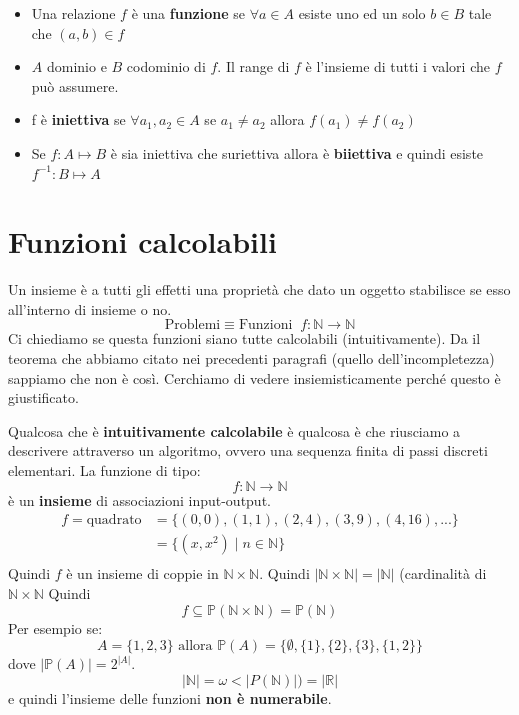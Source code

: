 \documentclass[a4paper]{article}
\begin{document}
\begin{itemize}
    \item Una relazione $f$ è una \textbf{funzione} se $\forall a \in A$ esiste uno ed un solo $b \in B$ tale che $(a,b) \in f$
    \item $A$ dominio e $B$ codominio di $f$. Il range di $f$ è l'insieme di tutti i valori che $f$ può assumere.
    \item f è \textbf{iniettiva} se $\forall a_1,a_2 \in A$ se $a_1 \neq a_2$ allora $f(a_1) \neq f(a_2)$
    \item Se $f : A \mapsto B$ è sia iniettiva che suriettiva allora è \textbf{biiettiva} e quindi esiste $f^{-1} : B \mapsto A$ 
\end{itemize}



\section{Funzioni calcolabili}

Un insieme è a tutti gli effetti una proprietà che dato un oggetto
stabilisce se esso all'interno di insieme o no.
\[\text{Problemi} \equiv \text{Funzioni} \; \; f : \mathbb{N} \rightarrow \mathbb{N}\]
Ci chiediamo se questa funzioni siano tutte calcolabili (intuitivamente). Da il teorema che abbiamo citato
nei precedenti paragrafi (quello dell'incompletezza) sappiamo che non è così.
Cerchiamo di vedere insiemisticamente perché questo è giustificato.

{
Qualcosa che è \textbf{intuitivamente calcolabile} è qualcosa è che riusciamo a descrivere
attraverso un algoritmo, ovvero una sequenza finita di passi discreti elementari.
}
La funzione di tipo:
\[f : \mathbb{N} \rightarrow \mathbb{N}\]
è un \textbf{insieme} di associazioni input-output. 
\ex{}
{
    \[
    \begin{aligned}
        f = \text{quadrato} &= \{(0,0), (1,1), (2,4), (3,9), (4,16), ...\} \\
        &= \{(x,x^2) \; | \; n \in \mathbb{N} \} \\
    \end{aligned}   \]
    Quindi $f$ è un insieme di coppie in $\mathbb{N} \times \mathbb{N}$.
    Quindi $|\mathbb{N} \times \mathbb{N}| = |\mathbb{N}|$ (cardinalità di $\mathbb{N} \times \mathbb{N}$
    Quindi
    \[f \subseteq \mathbb{P}(\mathbb{N} \times \mathbb{N}) = \mathbb{P}(\mathbb{N})\]
    Per esempio se:
    \[A=\{1,2,3\} \text{ allora } \mathbb{P}(A) = \{\emptyset, \{1\}, \{2\}, \{3\}, \{1,2\}\}\]
    dove $|\mathbb{P}(A)| = 2^{|A|}$. 
    \[|\mathbb{N}| = \omega < |P(\mathbb{N})|) = |\mathbb{R}|\]
    e quindi l'insieme delle funzioni \textbf{non è numerabile}.
}
\end{document}
